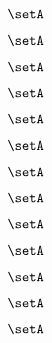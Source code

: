 \begin{forslides}
    \begin{equation}
        \label{eq:slides-translation-14}
        \setA
    \end{equation}

    \begin{equation}
        \label{eq:slides-translation-15}
        \setA
    \end{equation}

    \begin{equation}
        \label{eq:slides-translation-16}
        \setA
    \end{equation}

    \begin{equation}
        \label{eq:slides-translation-17}
        \setA
    \end{equation}

    \begin{equation}
        \label{eq:slides-translation-18}
        \setA
    \end{equation}

    \begin{equation}
        \label{eq:slides-translation-19}
        \setA
    \end{equation}

    \begin{equation}
        \label{eq:slides-translation-20}
        \setA
    \end{equation}

    \begin{equation}
        \label{eq:slides-translation-21}
        \setA
    \end{equation}

    \begin{equation}
        \label{eq:slides-translation-22}
        \setA
    \end{equation}

    \begin{equation}
        \label{eq:slides-translation-23}
        \setA
    \end{equation}

    \begin{equation}
        \label{eq:slides-translation-24}
        \setA
    \end{equation}

    \begin{equation}
        \label{eq:slides-translation-25}
        \setA
    \end{equation}

    \begin{equation}
        \label{eq:slides-translation-26}
        \setA
    \end{equation}


\end{forslides}
